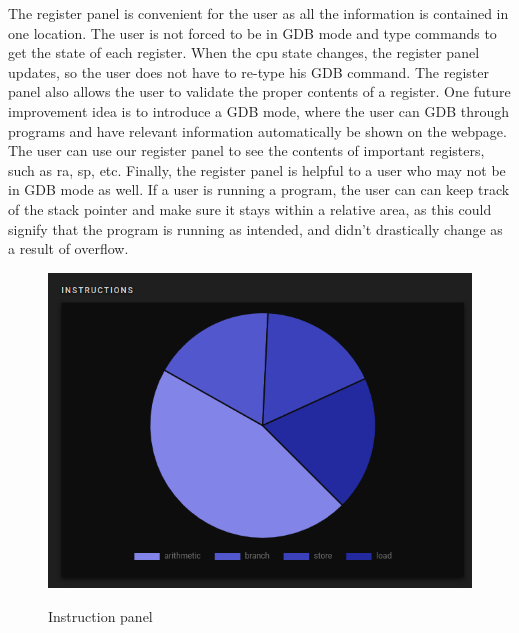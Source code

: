 The register panel is convenient for the user as all the information is contained in one location. The user
is not forced to be in GDB mode and type commands to get the state of each register. When the cpu state changes,
the register panel updates, so the user does not have to re-type his GDB command. The register panel also
allows the user to validate the proper contents of a register. One future improvement idea is to introduce
a GDB mode, where the user can GDB through programs and have relevant information automatically be
shown on the webpage. The user can use our register panel to see the contents of important registers, such
as ra, sp, etc. Finally, the register panel is helpful to a user who may not be in GDB mode as well.
If a user is running a program, the user can can keep track of the stack pointer and make sure it stays
within a relative area, as this could signify that the program is running as intended, and didn't drastically
change as a result of overflow.

\begin{figure}[H]
  \includegraphics[scale=.4]{inst}
  \label{fig:inst}
  \caption{Instruction panel}
  \centering
\end{figure}

\noindent


